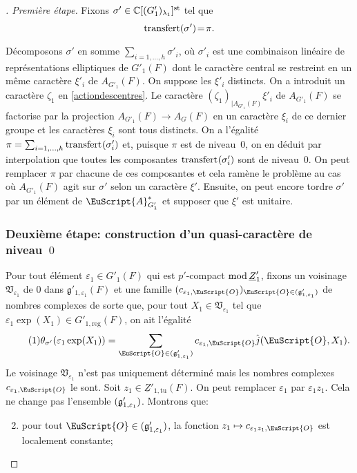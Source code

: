 \documentclass[JEP,XML,SOM,Unicode,francais]{cedram}
\let\mathcal \EuScript
\newcommand{\NoChangel}[1]{%
\expandafter\let\csname old\string#1\endcsname=#1
\let#1=\relax
\newcommand{#1}{\mathcode`l="716C\csname old\string#1\endcsname\mathcode`l="7160 }%
}
\let\epsilon\varepsilon
\newcommand\mto{\mathchoice{\longmapsto}{\mapsto}{\mapsto}{\mapsto}}
\newcommand{\rmod}{\textup{mod}\,}
\newcommand{\frg}{\mathfrak{g}}
\newcommand{\frV}{\mathfrak{V}}
\newcommand{\rell}{\mathrm{ell}} \NoChangel{\rell}
\newcommand{\Ell}{\mathrm{Ell}} \NoChangel{\Ell}
\newcommand{\Nil}{\mathrm{Nil}} \NoChangel{\Nil}
\newcommand{\reg}{\mathrm{reg}}
\newcommand{\st}{\mathrm{st}}
\newcommand{\tu}{\mathrm{tu}}
\DeclareMathOperator{\transfert}{transfert}
\newcommand{\cA}{\mathcal{A}}
\newcommand{\cO}{\mathcal{O}}
\newcommand{\CC}{\mathbb{C}}
\theoremstyle{plain}
\theoremstyle{definition}
\begin{document}
\begin{proof}[\proofname. Première étape]
Fixons $\sigma'\in\CC[\Ell(G'_{1})_{\lambda_{1}}]^{\st}$ tel que \[
\transfert_{\rell}(\sigma')\!=\!\pi.
\]
Décomposons $\sigma'$ en somme $\sum_{i=1,\dots,h}\sigma'_{i}$, où $\sigma'_{i}$ est une combinaison linéaire de représentations elliptiques de $G'_{1}(F)$ dont le caractère central se restreint en un même carac\-tère $\xi'_{i}$ de $A_{G'_{1}}(F)$. On suppose les $\xi'_{i}$ distincts. On a introduit un caractère $\zeta_{1}$ en \ref{actiondescentres}. Le caractère $(\zeta_{1})_{ \vert A_{G'_{1}}(F)}\xi'_{i}$ de $A_{G'_{1}}(F)$ se factorise par la projection $A_{G'_{1}}(F)\to A_{G}(F)$ en un caractère $\xi_{i}$ de ce dernier groupe et les caractères $\xi_{i}$ sont tous distincts. On a l'égalité $\pi=\sum_{i=1,\dots,h}\transfert_{\rell}(\sigma'_{i})$ et, puisque $\pi$ est de niveau~$0$, on en déduit par interpolation que toutes les composantes $\transfert_{\rell}(\sigma'_{i})$ sont de niveau~$0$. On peut remplacer $\pi$ par chacune de ces composantes et cela ramène le problème au cas où $A_{G'_{1}}(F)$ agit sur $\sigma'$ selon un caractère $\xi'$. Ensuite, on peut encore tordre $\sigma'$ par un élément de $\cA_{G'_{1}}^*$ et supposer que $\xi'$ est unitaire.

\subsubsection*{Deuxième étape: construction d'un quasi-caractère de niveau~$0$}

Pour tout élément $\epsilon_{1}\in G'_{1}(F)$ qui est $p'$-compact $\rmod \underline{Z}'_{1}$, fixons un voisinage $\frV_{\epsilon_{1}}$ de $0$ dans $\frg'_{1,\epsilon_{1}}(F)$ et une famille $(c_{\epsilon_{1},\cO})_{\cO\in \Nil(\frg'_{1,\epsilon_{1}})}$ de nombres complexes de sorte que, pour tout $X_{1}\in \frV_{\epsilon_{1}}$ tel que $\epsilon_{1}\exp(X_{1})\in G'_{1,\reg}(F)$, on ait l'égalité
\begin{equation}\tag{1}\label{unereciproque1}
\theta_{\sigma'}(\epsilon_{1}\exp(X_{1}))=\sum_{\cO\in \Nil(\frg'_{1,\epsilon_{1}})}c_{\epsilon_{1},\cO}\hat{j}(\cO,X_{1}).
\end{equation}
Le voisinage $\frV_{\epsilon_{1}}$ n'est pas uniquement déterminé mais les nombres complexes $c_{\epsilon_{1},\cO}$ le sont. Soit $z_{1}\in \underline{Z}'_{1,\tu}(F)$. On peut remplacer $\epsilon_{1}$ par $\epsilon_{1}z_{1}$. Cela ne change pas l'ensemble $\Nil(\frg'_{1,\epsilon_{1}})$. Montrons que:
\begin{enumerate}\setcounter{enumi}{1}
\item\label{unereciproque2}
pour tout $\cO\in \Nil(\frg'_{1,\epsilon_{1}})$, la fonction $z_{1}\mto c_{\epsilon_{1}z_{1},\cO}$ est localement constante;


\end{enumerate}
\end{proof}
\end{document}

